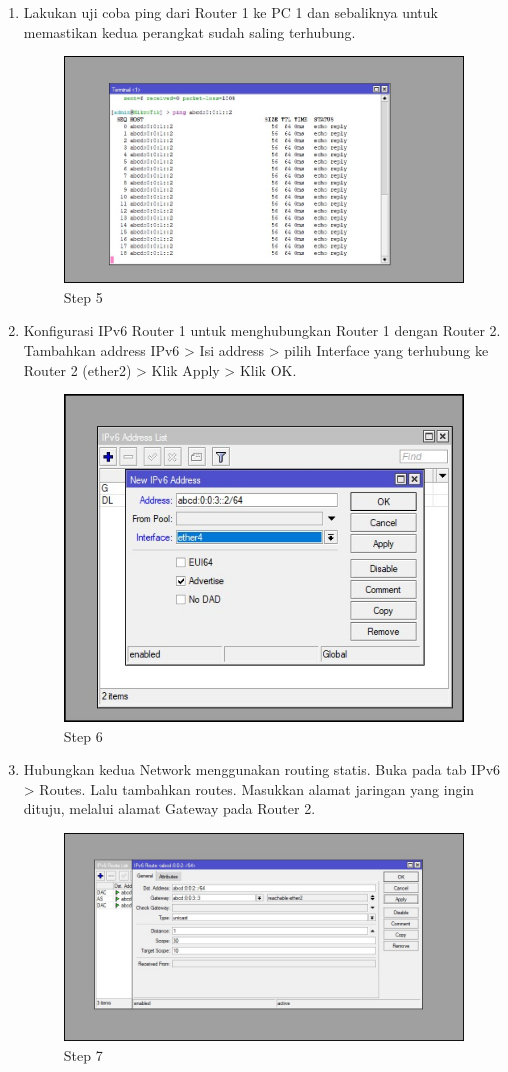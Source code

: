 \begin{enumerate}
	\item Lakukan uji coba ping dari Router 1 ke PC 1 dan sebaliknya untuk memastikan kedua perangkat
	sudah saling terhubung.	
	
	\begin{figure}[H]
		\centering
		\includegraphics[width=0.7\linewidth]{P5/img/step5.jpg}
		\caption{Step 5}
		\label{fig:gambar1}
	\end{figure}

	\item Konfigurasi IPv6 Router 1 untuk menghubungkan Router 1 dengan Router 2. Tambahkan
	address IPv6 > Isi address > pilih Interface yang terhubung ke Router 2 (ether2) > Klik Apply > Klik OK.
	
	\begin{figure}[H]
		\centering
		\includegraphics[width=0.7\linewidth]{P5/img/step6.jpg}
		\caption{Step 6}
		\label{fig:gambar1}
	\end{figure}

	\item Hubungkan kedua Network menggunakan routing statis. Buka pada tab IPv6 > Routes. Lalu
	tambahkan routes. Masukkan alamat jaringan yang ingin dituju, melalui alamat Gateway pada
	Router 2.
	
	\begin{figure}[H]
		\centering
		\includegraphics[width=0.7\linewidth]{P5/img/step7.jpg}
		\caption{Step 7}
		\label{fig:gambar1}
	\end{figure}


\end{enumerate}
